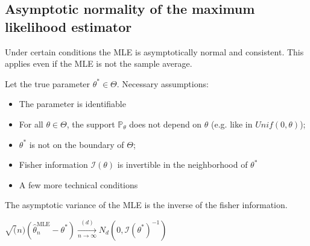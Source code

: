 \subsection*{Asymptotic normality of the maximum likelihood estimator}

Under certain conditions the MLE is asymptotically normal and consistent. This applies even if the MLE is not the sample average.

Let the true parameter $\theta^{*} \in \Theta$. Necessary assumptions:

\begin{itemize}
\item The parameter is identifiable
\item For all $\theta \in \Theta$, the support $\mathbb{P}_{\theta}$ does not depend on $\theta$ (e.g. like in $Unif(0,\theta)$);
\item $\theta^{*}$ is not on the boundary of $\Theta$;
\item Fisher information $\mathcal{I}(\theta)$  is invertible in the neighborhood of $\theta^{*}$
\item A few more technical conditions
\end{itemize}

The asymptotic variance of the MLE is the inverse of the fisher information.

$\sqrt(n)(\widehat{\theta }_ n^{\text {MLE}} - \theta^*) \xrightarrow[n \rightarrow \infty]{(d)} N_d(0,\mathcal{I}(\theta^* )^{-1})$\\
